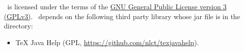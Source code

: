 %
\FlowframTk\ is licensed under the terms of the 
\href{https://www.gnu.org/licenses/gpl-3.0.html}{GNU General
Public License version 3 (GPLv3)}.
\FlowframTk\ depends on the following third party library whose
jar file is in the  directory:
\begin{itemize}
   \item TeX Java Help 
   (GPL, \url{https://github.com/nlct/texjavahelp}).
\end{itemize}





\printmain
\printindex 

 

